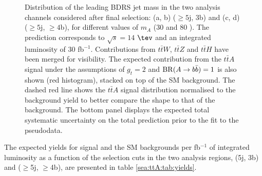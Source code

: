 \begin{figure}[p!]
\begin{subfigure}{0.5\textwidth}
  \caption{}
  \label{}
\end{subfigure}
\captionsetup{width=0.85\textwidth} \caption{\small Distribution of the leading BDRS jet mass in the two analysis channels considered after final selection:  (a, b) ($\ge5$j, $3$b) and (c, d) ($\ge5$j, $\ge4$b), for different values of $m_{A}$ (30 and 80 \gev). The prediction corresponds to $\sqrt{s}=14$ $\tev$ and an integrated luminosity of 30 fb$^{-1}$.   Contributions from $t\bar{t}W$, $t\bar{t}Z$ and $t\bar{t}H$ have been merged for visibility. The expected contribution from the $t\bar{t}A$ signal under the assumptions of $g_{t}= 2$ and ${\rm BR}(A\to b\bar{b})=1$ is also shown (red histogram), stacked on top of the SM background.  The dashed red line shows the $t\bar{t}A$ signal distribution normalised to the background yield to better compare the shape to that of the background.  The bottom panel displays the expected total systematic uncertainty on the total prediction prior to the fit to the pseudodata.}
\label{sec:ttA:fig:bdrsmass}
\end{figure}

The expected yields for signal and the SM backgrounds per fb$^{-1}$ of integrated luminosity as a function of the selection cuts in the two analysis regions, (5j, 3b) and ($\ge$5j, $\ge$4b), are presented in table \ref{sea:ttA:tab:yields}. 



